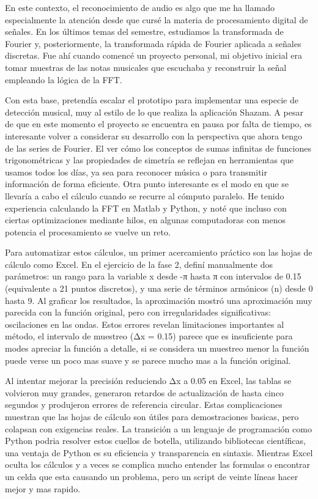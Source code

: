 {En este contexto, el reconocimiento de audio es algo que me ha llamado especialmente la atención desde que cursé la materia de procesamiento digital de señales. En los últimos temas del semestre, estudiamos la transformada de Fourier y, posteriormente, la transformada rápida de Fourier aplicada a señales discretas. Fue ahí cuando comencé un proyecto personal, mi objetivo inicial era tomar muestras de las notas musicales que escuchaba y reconstruir la señal empleando la lógica de la FFT. 

Con esta base, pretendía escalar el prototipo para implementar una especie de detección musical, muy al estilo de lo que realiza la aplicación Shazam. A pesar de que en este momento el proyecto se encuentra en pausa por falta de tiempo, es interesante volver a considerar su desarrollo con la perspectiva que ahora tengo de las series de Fourier. El ver cómo los conceptos de sumas infinitas de funciones trigonométricas y las propiedades de simetría se reflejan en herramientas que usamos todos los días, ya sea para reconocer música o para transmitir información de forma eficiente. Otra punto interesante es el modo en que se llevaría a cabo el cálculo cuando se recurre al cómputo paralelo. He tenido experiencia calculando la FFT en Matlab y Python, y noté que incluso con ciertas optimizaciones mediante hilos, en algunas computadoras con menos potencia el procesamiento se vuelve un reto. 

Para automatizar estos cálculos, un primer acercamiento práctico son las hojas de cálculo como Excel. En el ejercicio de la fase 2, definí manualmente dos parámetros: un rango para la variable x desde -π hasta π con intervalos de 0.15 (equivalente a 21 puntos discretos), y una serie de términos armónicos (n) desde 0 hasta 9. Al graficar los resultados, la aproximación mostró una aproximación muy parecida con la función original, pero con irregularidades significativas: oscilaciones en las ondas. Estos errores revelan limitaciones importantes al método, el intervalo de muestreo (Δx = 0.15) parece que es insuficiente para modes apreciar la función a detalle, si se considera un muestreo menor la función puede verse un poco mas suave y se parece mucho mas a la función original.

Al intentar mejorar la precisión reduciendo Δx a 0.05 en Excel, las tablas se volvieron muy grandes, generaron retardos de actualización de hasta cinco segundos y produjeron errores de referencia circular. Estas complicaciones muestran que las hojas de cálculo son útiles para demostraciones basicas, pero colapsan con exigencias reales. La transición a un lenguaje de programación como Python podria resolver estos cuellos de botella, utilizando bibliotecas científicas, una ventaja de Python es su eficiencia y transparencia en sintaxis. Mientras Excel oculta los cálculos y a veces se complica mucho entender las formulas o encontrar un celda que esta causando un problema, pero un script de veinte líneas hacer mejor y mas rapido. 

}
